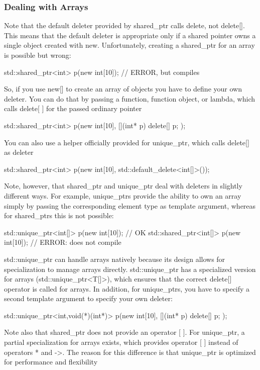 \documentclass{report}
\begin{document}
\subsubsection{Dealing with Arrays}
\bigbreak \noindent 
Note that the default deleter provided by shared\_ptr calls delete, not delete[]. This means
that the default deleter is appropriate only if a shared pointer owns a single object created with new.
Unfortunately, creating a shared\_ptr for an array is possible but wrong:
\bigbreak \noindent 
\begin{cppcode}
std::shared_ptr<int> p(new int[10]); // ERROR, but compiles
\end{cppcode}
\bigbreak \noindent 
So, if you use new[] to create an array of objects you have to define your own deleter. You can do
that by passing a function, function object, or lambda, which calls delete[ ] for the passed ordinary
pointer
\bigbreak \noindent 
\begin{cppcode}
    std::shared_ptr<int> p(new int[10],
    [](int* p) {
        delete[] p;
    });
\end{cppcode}
\bigbreak \noindent 
You can also use a helper officially provided for unique\_ptr, which calls delete[] as deleter
\bigbreak \noindent 
\begin{cppcode}
    std::shared_ptr<int> p(new int[10], std::default_delete<int[]>());
\end{cppcode}
\bigbreak \noindent 
Note, however, that shared\_ptr and unique\_ptr deal with deleters in slightly different ways. For
example, unique\_ptrs provide the ability to own an array simply by passing the corresponding
element type as template argument, whereas for shared\_ptrs this is not possible:
\bigbreak \noindent 
\begin{cppcode}
std::unique_ptr<int[]> p(new int[10]); // OK
std::shared_ptr<int[]> p(new int[10]); // ERROR: does not compile
\end{cppcode}
\bigbreak \noindent 
std::unique\_ptr can handle arrays natively because its design allows for specialization to manage arrays directly. std::unique\_ptr has a specialized version for arrays (std::unique\_ptr<T[]>), which ensures that the correct delete[] operator is called for arrays.
\bigbreak \noindent 
In addition, for unique\_ptrs, you have to specify a second template argument to specify your own deleter:
\bigbreak \noindent 
\begin{cppcode}
    std::unique_ptr<int,void(*)(int*)> p(new int[10],
    [](int* p) {
        delete[] p;
    });
\end{cppcode}
\bigbreak \noindent 
Note also that shared\_ptr does not provide an operator [ ]. For unique\_ptr, a partial specialization for arrays exists, which provides operator [ ] instead of operators * and ->. The reason for
this difference is that unique\_ptr is optimized for performance and flexibility
\end{document}
